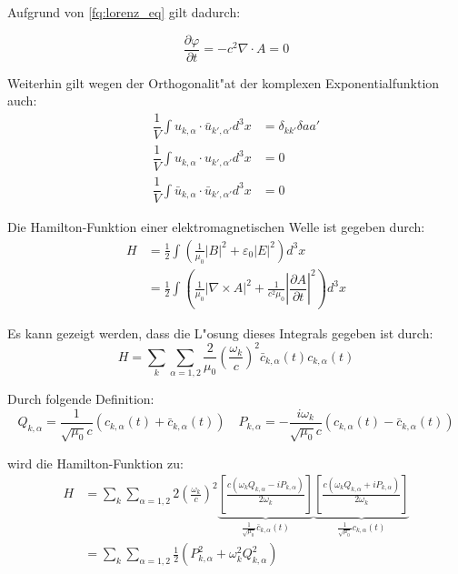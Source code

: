 Aufgrund von \ref{fq:lorenz_eq} gilt dadurch:

\begin{equation*}
\frac{\partial \varphi }{\partial t} = - c^2 \nabla \cdot A = 0
\end{equation*}

Weiterhin gilt wegen der Orthogonalit"at der komplexen Exponentialfunktion auch:
\begin{align*}
\dfrac{1}{V} \int u_{k,\alpha} \cdot \bar{u}_{k',\alpha'} d^3 x &= \delta_{kk'}\delta{aa'} \\
\dfrac{1}{V} \int u_{k,\alpha} \cdot u_{k',\alpha'} d^3 x &= 0 \\
\dfrac{1}{V} \int \bar{u}_{k,\alpha} \cdot \bar{u}_{k',\alpha'} d^3 x &= 0
\end{align*}

Die Hamilton-Funktion einer elektromagnetischen Welle ist gegeben durch:
\begin{equation*}
\begin{split}
H &= \frac{1}{2} \int \left(\frac{1}{\mu_0}|B|^2 + \varepsilon_0|E|^2\right) d^3 x \\
	&= \frac{1}{2} \int \left(\frac{1}{\mu_0} | \nabla\times A |^2 + \frac{1}{c^2 \mu_0} \left| \dfrac{\partial A}{\partial t} \right|^2 \right) d^3 x 
\end{split}
\end{equation*}

Es kann gezeigt werden, dass die L"osung dieses Integrals gegeben ist durch:
\begin{equation*}
H = \sum_k \sum_{\alpha=1,2} \frac{2}{\mu_0} \left(\frac{\omega_k}{c}\right)^2 \bar{c}_{k,\alpha}(t) c_{k,\alpha}(t)
\end{equation*}

Durch folgende Definition:
\begin{equation*}
Q_{k,\alpha} = \frac{1}{\sqrt{\mu_0} c}\left(c_{k,\alpha}(t) + \bar{c}_{k,\alpha}(t)\right) \quad P_{k,\alpha} = -\frac{i\omega_k}{\sqrt{\mu_0} c}\left(c_{k,\alpha}(t) - \bar{c}_{k,\alpha}(t)\right) 
\end{equation*}

wird die Hamilton-Funktion zu:
\begin{equation} \label{fq:hamilton}
\begin{split}
H &= \sum_k \sum_{\alpha=1,2} 2 \left(\frac{\omega_k}{c}\right)^2 
	\underbrace{\left[ \frac{c(\omega_k Q_{k,\alpha} - i P_{k,\alpha})}{2 \omega_k} \right]}_{\frac{1}{\sqrt{\mu_0}} \bar{c}_{k,\alpha}(t)}
	\underbrace{\left[ \frac{c(\omega_k Q_{k,\alpha} + i P_{k,\alpha})}{2 \omega_k} \right]}_{\frac{1}{\sqrt{\mu_0}} c_{k,\alpha}(t)} \\
&= \sum_k \sum_{\alpha=1,2} \frac{1}{2} \left(P_{k,\alpha}^2 + \omega_k^2 Q_{k,\alpha}^2\right)
\end{split}
\end{equation}

